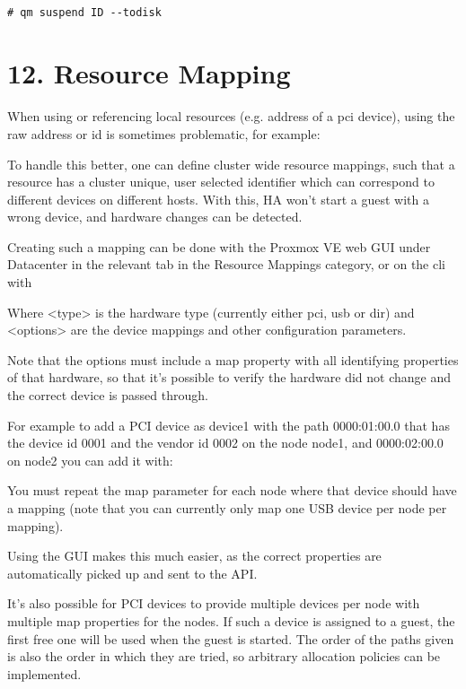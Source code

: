 \begin{lstlisting}

# qm suspend ID --todisk

\end{lstlisting}


\section{12. Resource Mapping}

When using or referencing local resources (e.g. address of a pci device), using the raw address or id is sometimes problematic, for example:

To handle this better, one can define cluster wide resource mappings, such that a resource has a cluster unique, user selected identifier which can correspond to different devices on different hosts. With this, HA won’t start a guest with a wrong device, and hardware changes can be detected.

Creating such a mapping can be done with the Proxmox VE web GUI under Datacenter in the relevant tab in the Resource Mappings category, or on the cli with

Where <type> is the hardware type (currently either pci, usb or dir) and <options> are the device mappings and other configuration parameters.

Note that the options must include a map property with all identifying properties of that hardware, so that it’s possible to verify the hardware did not change and the correct device is passed through.

For example to add a PCI device as device1 with the path 0000:01:00.0 that has the device id 0001 and the vendor id 0002 on the node node1, and 0000:02:00.0 on node2 you can add it with:

You must repeat the map parameter for each node where that device should have a mapping (note that you can currently only map one USB device per node per mapping).

Using the GUI makes this much easier, as the correct properties are automatically picked up and sent to the API.

It’s also possible for PCI devices to provide multiple devices per node with multiple map properties for the nodes. If such a device is assigned to a guest, the first free one will be used when the guest is started. The order of the paths given is also the order in which they are tried, so arbitrary allocation policies can be implemented.

